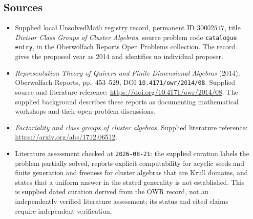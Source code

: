 \documentclass[11pt]{article}
\begin{document}
\subsection{Sources}
\begin{itemize}
\item Supplied local UnsolvedMath registry record, permanent ID \(30002517\), title \emph{Divisor Class Groups of Cluster Algebras}, source problem code \texttt{catalogue entry}, in the Oberwolfach Reports Open Problems collection. The record gives the proposed year as 2014 and identifies no individual proposer.
\item \emph{Representation Theory of Quivers and Finite Dimensional Algebras} (2014), Oberwolfach Reports, pp.\ 453--529, DOI \texttt{10.4171/owr/2014/08}. Supplied source and literature reference: \url{https://doi.org/10.4171/owr/2014/08}. The supplied background describes these reports as documenting mathematical workshops and their open-problem discussions.
\item \emph{Factoriality and class groups of cluster algebras}. Supplied literature reference: \url{https://arxiv.org/abs/1712.06512}.
\item Literature assessment checked at \texttt{2026-08-21}: the supplied curation labels the problem partially solved, reports explicit computability for acyclic seeds and finite generation and freeness for cluster algebras that are Krull domains, and states that a uniform answer in the stated generality is not established. This is supplied dated curation derived from the OWR record, not an independently verified literature assessment; its status and cited claims require independent verification.
\end{itemize}
\end{document}
